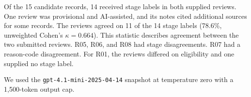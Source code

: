 Of the 15 candidate records, 14 received stage labels in both supplied
reviews. One review was provisional and AI-assisted, and its notes cited
additional sources for some records. The reviews agreed on 11 of the 14
stage labels (78.6\%, unweighted Cohen's $\kappa=0.664$). This statistic
describes agreement between the two submitted reviews. R05, R06, and R08
had stage disagreements. R07 had a reason-code disagreement. For R01, the
reviews differed on eligibility and one supplied no stage label.

We used the \texttt{gpt-4.1-mini-2025-04-14} snapshot at temperature zero
with a 1,500-token output cap.

